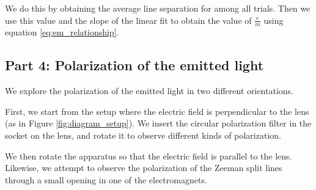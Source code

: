 We do this by obtaining the average line separation for among all trials.
Then we use this value and the slope of the linear fit to obtain the value of $\frac{e}{m}$ using equation \ref{eq:em_relationship}.

\subsection{Part 4: Polarization of the emitted light}

We explore the polarization of the emitted light in two different orientations.

First, we start from the setup where the electric field is perpendicular to the lens (as in Figure \ref{fig:diagram_setup}).
We insert the circular polarization filter in the socket on the lens, and rotate it to observe different kinds of polarization.

We then rotate the apparatus so that the electric field is parallel to the lens.
Likewise, we attempt to observe the polarization of the Zeeman split lines through a small opening in one of the electromagnets.